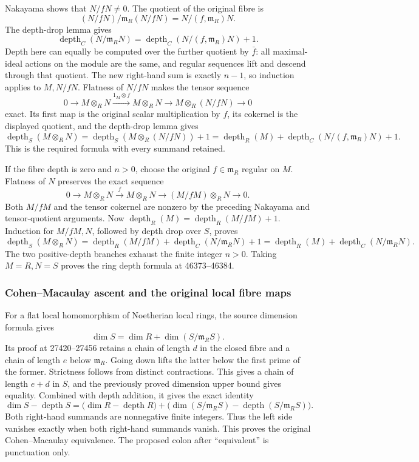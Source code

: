Nakayama shows that \(N/fN\ne0\). The quotient of the original fibre is \[
 (N/fN)/\mathfrak m_R(N/fN)
 =N/(f,\mathfrak m_R)N.
\] The depth-drop lemma gives \[
 \operatorname{depth}_C(N/\mathfrak m_RN)
 =\operatorname{depth}_C(N/(f,\mathfrak m_R)N)+1.
\] Depth here can equally be computed over the further quotient by \(\bar f\): all maximal-ideal actions on the module are the same, and regular sequences lift and descend through that quotient. The new right-hand sum is exactly \(n-1\), so induction applies to \(M,N/fN\). Flatness of \(N/fN\) makes the tensor sequence \[
 0\to M\otimes_RN\xrightarrow{1_M\otimes f}M\otimes_RN
 \to M\otimes_R(N/fN)\to0
\] exact. Its first map is the original scalar multiplication by \(f\), its cokernel is the displayed quotient, and the depth-drop lemma gives \[
 \operatorname{depth}_S(M\otimes_RN)
 =\operatorname{depth}_S(M\otimes_R(N/fN))+1
 =\operatorname{depth}_R(M)
   +\operatorname{depth}_C(N/(f,\mathfrak m_R)N)+1.
\] This is the required formula with every summand retained.

If the fibre depth is zero and \(n>0\), choose the original \(f\in\mathfrak m_R\) regular on \(M\). Flatness of \(N\) preserves the exact sequence \[
 0\to M\otimes_RN\xrightarrow{f}M\otimes_RN
 \to (M/fM)\otimes_RN\to0.
\] Both \(M/fM\) and the tensor cokernel are nonzero by the preceding Nakayama and tensor-quotient arguments. Now \(\operatorname{depth}_R(M)=\operatorname{depth}_R(M/fM)+1\). Induction for \(M/fM,N\), followed by depth drop over \(S\), proves \[
 \operatorname{depth}_S(M\otimes_RN)
 =\operatorname{depth}_R(M/fM)
  +\operatorname{depth}_C(N/\mathfrak m_RN)+1
 =\operatorname{depth}_R(M)+\operatorname{depth}_C(N/\mathfrak m_RN).
\] The two positive-depth branches exhaust the finite integer \(n>0\). Taking \(M=R,N=S\) proves the ring depth formula at 46373--46384.

\subsubsection{Cohen--Macaulay ascent and the original local fibre maps}\label{algebra-proof-068-cohenmacaulay-ascent-and-the-original-local-fibre-maps}

For a flat local homomorphism of Noetherian local rings, the source dimension formula gives \[
 \dim S=\dim R+\dim(S/\mathfrak m_RS).
\] Its proof at 27420--27456 retains a chain of length \(d\) in the closed fibre and a chain of length \(e\) below \(\mathfrak m_R\). Going down lifts the latter below the first prime of the former. Strictness follows from distinct contractions. This gives a chain of length \(e+d\) in \(S\), and the previously proved dimension upper bound gives equality. Combined with depth addition, it gives the exact identity \[
 \dim S-\operatorname{depth}S
 =\bigl(\dim R-\operatorname{depth}R\bigr)
 +\bigl(\dim(S/\mathfrak m_RS)
       -\operatorname{depth}(S/\mathfrak m_RS)\bigr).
\] Both right-hand summands are nonnegative finite integers. Thus the left side vanishes exactly when both right-hand summands vanish. This proves the original Cohen--Macaulay equivalence. The proposed colon after ``equivalent'' is punctuation only.

